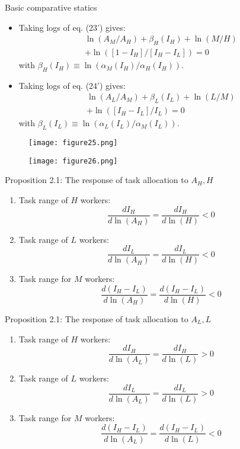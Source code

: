 \documentclass[notes=show]{beamer}
\begin{document}
\begin{frame}{Basic comparative statics}
\begin{itemize}
\item Taking logs of eq. (23') gives:
\begin{align*}
\ln (A_{M}/A_{H}) + \beta_{H}(I_{H}) + \ln (M/H) \\
+ \ln ([1 - I_{H}]/[I_{H} - I_{L}]) = 0  \tag{32} \label{eq32}
\end{align*}
with $ \beta_{H}(I_{H}) \equiv \ln ( \alpha_{M}(I_{H}) / \alpha_{H}(I_{H}))$. \medskip 
\item Taking logs of eq. (24') gives:
\begin{align*}
\ln (A_{L}/A_{M}) + \beta_{L}(I_{L}) + \ln (L/M) \\
+ \ln ([I_{H} - I_{L}]/I_{L}) = 0 \tag{33} \label{eq33}
\end{align*}
with $ \beta_{L}(I_{L}) \equiv \ln ( \alpha_{L}(I_{L}) / \alpha_{M}(I_{L}))$.
\end{itemize}
\end{frame}

\newpage
\begin{center}
\begin{figure}
\texttt{[image: figure25.png]}
\end{figure} 
\end{center}
\newpage

\newpage
\begin{center}
\begin{figure}
\texttt{[image: figure26.png]}
\end{figure} 
\end{center}
\newpage

\begin{frame}{Proposition 2.1: The response of task allocation to $A_{H},H$}
\begin{enumerate}
\item Task range of $H$ workers:
\[
\frac{dI_{H}}{d \ln (A_{H})} = \frac{d I_{H}}{d \ln (H)} < 0
\]
\item Task range of $L$ workers:
\[
\frac{dI_{L}}{d \ln (A_{H})} = \frac{d I_{L}}{d \ln (H)} < 0
\]
\item Task range for $M$ workers:
\[
\frac{d (I_{H} - I_{L})}{d \ln (A_{H})} = \frac{d (I_{H} - I_{L})}{d \ln (H)} < 0
\]
\end{enumerate}
\end{frame}

\begin{frame}{Proposition 2.1: The response of task allocation to $A_{L},L$}
\begin{enumerate}
\item Task range of $H$ workers:
\[
\frac{dI_{H}}{d \ln (A_{L})} = \frac{d I_{H}}{d \ln (L)} > 0
\]
\item Task range of $L$ workers:
\[
\frac{dI_{L}}{d \ln (A_{L})} = \frac{d I_{L}}{d \ln (L)} > 0
\]
\item Task range for $M$ workers:
\[
\frac{d (I_{H} - I_{L})}{d \ln (A_{L})} = \frac{d (I_{H} - I_{L})}{d \ln (L)} < 0
\]
\end{enumerate}
\end{frame}
\end{document}
